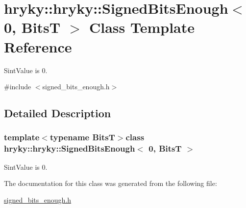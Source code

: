 \hypertarget{classhryky_1_1hryky_1_1_signed_bits_enough_3_010_00_01_bits_t_01_4}{\section{hryky\-:\-:hryky\-:\-:Signed\-Bits\-Enough$<$ 0, Bits\-T $>$ Class Template Reference}
\label{classhryky_1_1hryky_1_1_signed_bits_enough_3_010_00_01_bits_t_01_4}
}


Sint\-Value is 0.  




{\ttfamily \#include $<$signed\-\_\-bits\-\_\-enough.\-h$>$}



\subsection{Detailed Description}
\subsubsection*{template$<$typename Bits\-T$>$class hryky\-::hryky\-::\-Signed\-Bits\-Enough$<$ 0, Bits\-T $>$}

Sint\-Value is 0. 

The documentation for this class was generated from the following file\-:\begin{DoxyCompactItemize}
\item 
\hyperlink{signed__bits__enough_8h}{signed\-\_\-bits\-\_\-enough.\-h}\end{DoxyCompactItemize}
